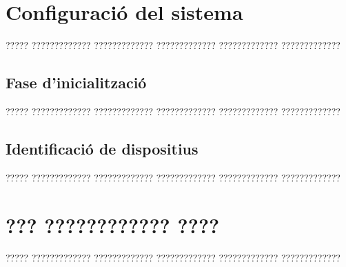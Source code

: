 \documentclass[11pt,spanish,listoffigures,listoftables]{tfgetsinf}
\begin{document}
\APPENDIX


\chapter{Configuració del sistema}

????? ????????????? ????????????? ????????????? ????????????? ?????????????

\section{Fase d'inicialització}

????? ????????????? ????????????? ????????????? ????????????? ?????????????

\section{Identificació de dispositius}

????? ????????????? ????????????? ????????????? ????????????? ?????????????



\chapter{??? ???????????? ????}

????? ????????????? ????????????? ????????????? ????????????? ????????????? 


\end{document}
